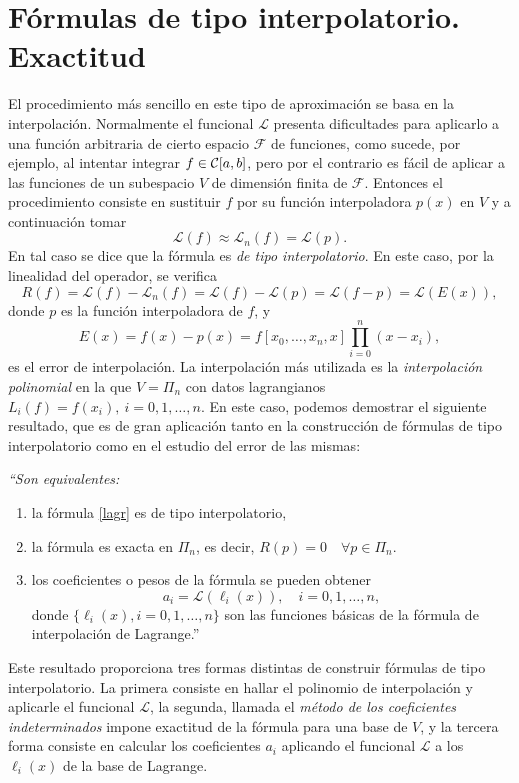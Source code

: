 \section{Fórmulas de tipo interpolatorio. Exactitud}

El procedimiento m\'as sencillo en este tipo de aproximaci\'on se basa en la
interpolaci\'on. Normalmente el funcional $\mathcal{L}$ presenta dificultades para
aplicarlo a una funci\'on arbitraria de cierto espacio $\mathcal{F}$ de funciones, como
sucede, por ejemplo, al intentar integrar
$f \in {\cal C}[a,b]$, pero por el contrario
es f\'acil de aplicar a las funciones de un subespacio $V$ de 
dimensi\'on finita de $\mathcal{F}$. Entonces el
procedimiento consiste en sustituir $f$ por su funci\'on interpoladora $p(x)$
en $V$ y a continuaci\'on tomar
$$
\mathcal{L}(f) \approx \mathcal{L}_n(f) = \mathcal{L}(p).
$$
En tal caso se dice que la f\'ormula es {\it de tipo interpolatorio}. En este caso, por la linealidad del operador, se verifica
$$R(f) = \mathcal{L}(f) - \mathcal{L}_n(f) = \mathcal{L}(f) - \mathcal{L}(p) = \mathcal{L}(f-p) = \mathcal{L}(E(x)),$$
donde $p$ es la funci\'on interpoladora de $f$, y 
$$E(x) = f(x) - p(x) = f[x_0,\ldots,x_n,x] \prod_{i=0}^n (x-x_i),
$$
es el error de interpolaci\'on. La interpolaci\'on m\'as utilizada es la {\it interpolaci\'on polinomial} en la que $V = \Pi_n$ con datos lagrangianos $L_i(f) = f(x_i),\ i=0, 1, \ldots,n$. En este caso, podemos demostrar el siguiente resultado, que es de gran aplicaci\'on tanto en la construcci\'on de f\'ormulas de
tipo interpolatorio como en el estudio del error de las mismas:

\smallskip
\noindent
{\em
``Son equivalentes:
\begin{enumerate}
\item la f\'ormula \eqref{lagr} es de tipo interpolatorio, 

\item la f\'ormula es exacta en $\Pi_n$, es decir, $R(p) = 0\quad \forall p \in \Pi_n.$

\item los coeficientes o pesos de la f\'ormula se pueden obtener 
$$a_i = \mathcal{L}(\ell_i(x)),\quad i=0, 1, \ldots, n,$$ 
donde $\{\ell_i(x), i=0, 1, \ldots, n\}$ son las funciones b\'asicas de la f\'ormula de interpolaci\'on de Lagrange.''
\end{enumerate}
}
\smallskip

Este resultado proporciona tres formas distintas de construir f\'ormulas de tipo
interpolatorio. La primera consiste en hallar el
polinomio de interpolaci\'on y aplicarle el funcional $\mathcal{L}$, la segunda, llamada el {\it m\'etodo de los coeficientes indeterminados} impone exactitud de la f\'ormula para una base de $V$, y la tercera forma consiste en calcular los coeficientes $a_i$ aplicando el funcional $\mathcal{L}$ a los $\ell_i(x)$ de la base de Lagrange.



